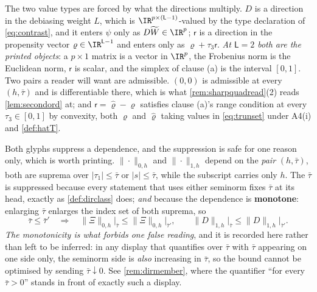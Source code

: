 \begin{definition}
The two value types are forced by what the directions multiply. $D$ is a direction in the debiasing
weight $L$, which is $\IR^{p\times(\mathsf L-1)}$-valued by the type declaration of \eqref{eq:contrast},
and it enters $\psi$ only as $D\widetilde W\in\IR^{p}$; $\mathsf r$ is a direction in the propensity
vector $\varrho\in\IR^{\mathsf L-1}$ and enters only as $\varrho+\tau_3\mathsf r$. \emph{At
$\mathsf L=2$ both are the printed objects}: a
$p\times1$ matrix is a vector in $\IR^{p}$, the Frobenius norm is the Euclidean norm, $\mathsf r$ is
scalar, and the simplex of clause \textup{(a)} is the interval $[0,1]$.
Two pairs a reader will want are admissible. $(0,0)$ is admissible at every $(h,\bar\tau)$ and is
differentiable there, which is what \cref{rem:sharpquadread}\textup{(2)} reads
\cref{lem:secondord} at; and $\mathsf r=\hat\varrho-\varrho$ satisfies clause \textup{(a)}'s range
condition at every $\tau_3\in[0,1]$ by convexity, both $\varrho$ and $\hat\varrho$ taking values in
\eqref{eq:trunset} under A4(i) and \cref{def:hatT}.

Both glyphs suppress a dependence, and the suppression is safe for one reason only, which is worth
printing. $\|\cdot\|_{0,h}$ and $\|\cdot\|_{1,h}$ depend on the \emph{pair} $(h,\bar\tau)$, both are
suprema over $|\tau_1|\le\bar\tau$ or $|s|\le\bar\tau$, while the subscript carries only $h$. The
$\bar\tau$ is suppressed because every statement that uses either seminorm fixes $\bar\tau$ at its head,
exactly as \cref{def:dirclass} does; \emph{and} because the dependence is \textbf{monotone}: enlarging
$\bar\tau$ enlarges the index set of both suprema, so
\[
\bar\tau\le\bar\tau'\quad\Longrightarrow\quad
\|\Xi\|_{0,h}\big|_{\bar\tau}\le\|\Xi\|_{0,h}\big|_{\bar\tau'},
\qquad
\|D\|_{1,h}\big|_{\bar\tau}\le\|D\|_{1,h}\big|_{\bar\tau'} .
\]
\emph{The monotonicity is what forbids one false reading}, and it is recorded here rather than left to
be inferred: in any display that quantifies over $\bar\tau$ with $\bar\tau$ appearing on one side only,
the seminorm side is \emph{also} increasing in $\bar\tau$, so the bound cannot be optimised by sending
$\bar\tau\downarrow0$. See \cref{rem:dirmember}, where the quantifier ``for every $\bar\tau>0$'' stands
in front of exactly such a display.
\end{definition}

